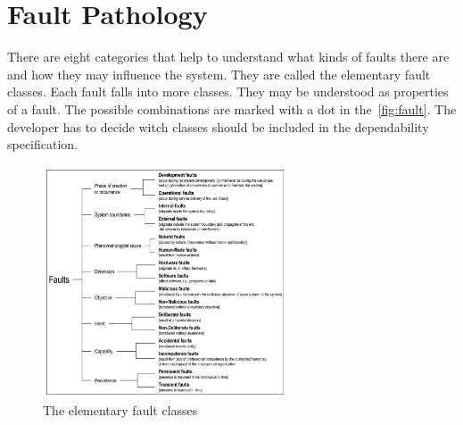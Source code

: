 \section{Fault Pathology}
There are eight categories that help to understand what kinds of faults there are and how they may influence the system. They are called the elementary fault classes. Each fault falls into more classes. They may be understood as properties of a fault. The possible combinations are marked with a dot in the~\autoref{fig:fault}. The developer has to decide witch classes should be included in the dependability specification.

\begin{figure}[H]
\centering
\includegraphics[width=0.65\textwidth]{figures/fault.png}
\caption{The elementary fault classes~\cite{art:Avizienis}}
\label{fig:fault}
\end{figure}

